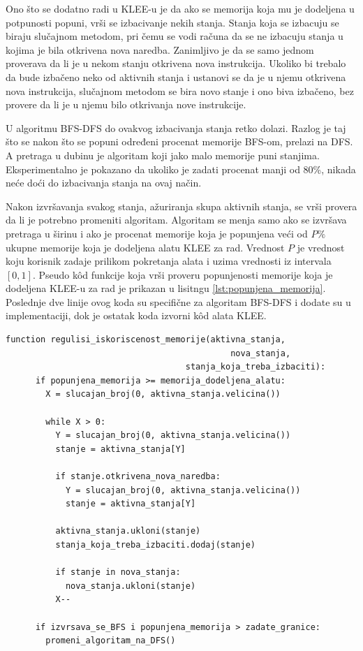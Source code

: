 \documentclass[12pt,oneside]{memoir}
\begin{document}
Ono što se dodatno radi u KLEE-u je da ako se memorija koja mu je dodeljena u potpunosti popuni, vrši se izbacivanje nekih stanja. Stanja koja se izbacuju se biraju slučajnom metodom, pri čemu se vodi računa da se ne izbacuju stanja u kojima je bila otkrivena nova naredba. Zanimljivo je da se samo jednom proverava da li je u nekom stanju otkrivena nova instrukcija. Ukoliko bi trebalo da bude izbačeno neko od aktivnih stanja i ustanovi se da je u njemu otkrivena nova instrukcija, slučajnom metodom se bira novo stanje i ono biva izbačeno, bez provere da li je u njemu bilo otkrivanja nove instrukcije. 

U algoritmu BFS-DFS do ovakvog izbacivanja stanja retko dolazi. Razlog je taj što se nakon  što se popuni određeni procenat memorije BFS-om, prelazi na DFS. A pretraga u dubinu je algoritam koji jako malo memorije puni stanjima. Eksperimentalno je pokazano da ukoliko je zadati procenat manji od 80\%, nikada neće doći do izbacivanja stanja na ovaj način. 

Nakon izvršavanja svakog stanja, ažuriranja skupa aktivnih stanja, se vrši provera da li je potrebno promeniti algoritam. Algoritam se menja samo ako se izvršava pretraga u širinu i ako je procenat memorije koja je popunjena veći od $P\%$ ukupne memorije koja je dodeljena alatu KLEE za rad. Vrednost $P$ je vrednost koju korisnik zadaje prilikom pokretanja alata i uzima vrednosti iz intervala $[0, 1]$. Pseudo k\^od funkcije koja vrši proveru popunjenosti memorije koja je dodeljena KLEE-u za rad je prikazan u lisitngu \ref{lst:popunjena_memorija}. Poslednje dve linije ovog koda su specifične za algoritam BFS-DFS i dodate su u implementaciji, dok je ostatak koda izvorni k\^od alata KLEE.

\begin{lstlisting}[caption={Pseudo k\^od funkcije koja proverava koliko je memorije popunjeno},captionpos=b,label={lst:popunjena_memorija}]
    function regulisi_iskoriscenost_memorije(aktivna_stanja, 
                                             nova_stanja,
                                    stanja_koja_treba_izbaciti):
      if popunjena_memorija >= memorija_dodeljena_alatu:
        X = slucajan_broj(0, aktivna_stanja.velicina())

        while X > 0:
          Y = slucajan_broj(0, aktivna_stanja.velicina())
          stanje = aktivna_stanja[Y]
          
          if stanje.otkrivena_nova_naredba:
            Y = slucajan_broj(0, aktivna_stanja.velicina())
            stanje = aktivna_stanja[Y]

          aktivna_stanja.ukloni(stanje)
          stanja_koja_treba_izbaciti.dodaj(stanje)
          
          if stanje in nova_stanja:
            nova_stanja.ukloni(stanje)
          X--
          
      if izvrsava_se_BFS i popunjena_memorija > zadate_granice:
        promeni_algoritam_na_DFS()
    \end{lstlisting}
\end{document}

